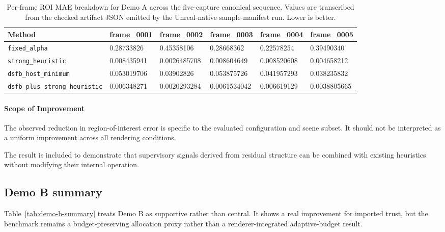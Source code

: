 \documentclass[11pt,letterpaper]{article}
\theoremstyle{gcresult}
\theoremstyle{definition}
\begin{document}
\begin{table}[H]
\centering
\caption{Per-frame ROI MAE breakdown for Demo A across the five-capture canonical sequence. Values are transcribed from the checked artifact JSON emitted by the Unreal-native sample-manifest run. Lower is better.}
\label{tab:per-frame-mae}
\tiny
\setlength{\tabcolsep}{4pt}
\begin{tabularx}{\textwidth}{>{\raggedright\arraybackslash}p{3.5cm} X X X X X}
\toprule
Method & frame\_0001 & frame\_0002 & frame\_0003 & frame\_0004 & frame\_0005 \\
\midrule
\texttt{fixed\_alpha} & 0.28733826 & 0.45358106 & 0.28668362 & 0.22578254 & 0.39490340 \\
\texttt{strong\_heuristic} & 0.008435941 & 0.0026485708 & 0.008604649 & 0.008520608 & 0.004658212 \\
\texttt{dsfb\_host\_minimum} & 0.053019706 & 0.03902826 & 0.053875726 & 0.041957293 & 0.038235832 \\
\texttt{dsfb\_plus\_strong\_heuristic} & 0.006348271 & 0.0020293284 & 0.0061534042 & 0.006619129 & 0.0038805665 \\
\bottomrule
\end{tabularx}
\end{table}


\paragraph{Scope of Improvement}

The observed reduction in region-of-interest error is specific to the evaluated configuration and scene subset. It should not be interpreted as a uniform improvement across all rendering conditions.

The result is included to demonstrate that supervisory signals derived from residual structure can be combined with existing heuristics without modifying their internal operation.

\subsection{Demo B summary}

Table~\ref{tab:demo-b-summary} treats Demo B as supportive rather than central. It shows a real improvement for imported trust, but the benchmark remains a budget-preserving allocation proxy rather than a renderer-integrated adaptive-budget result.
\end{document}
